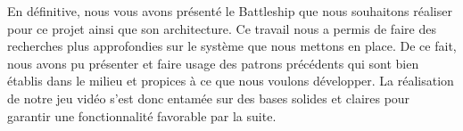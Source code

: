 \documentclass[12pt]{article}
\begin{document}
En définitive, nous vous avons présenté le Battleship que nous souhaitons réaliser pour ce projet ainsi que son architecture. Ce travail nous a permis de faire des recherches plus approfondies sur le système que nous mettons en place. De ce fait, nous avons pu présenter et faire usage des patrons précédents qui sont bien établis dans le milieu et propices à ce que nous voulons développer. La réalisation de notre jeu vidéo s'est donc entamée sur des bases solides et claires pour garantir une fonctionnalité favorable par la suite.

\newpage


\end{document}
